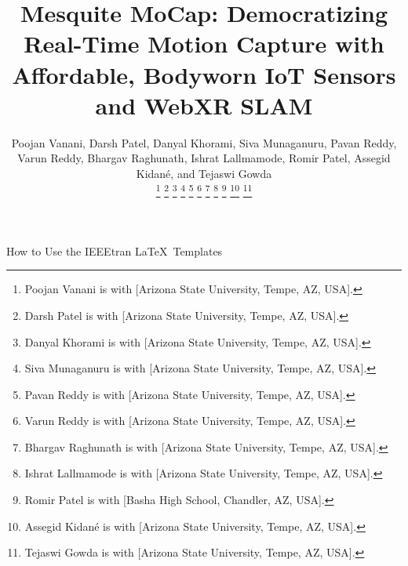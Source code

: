 \documentclass[lettersize,journal]{IEEEtran}
\begin{document}
\title{Mesquite MoCap: Democratizing Real-Time Motion Capture with Affordable, Bodyworn IoT Sensors and WebXR SLAM}

\author{Poojan Vanani, 
        Darsh Patel, 
        Danyal Khorami, 
        Siva Munaganuru, 
        Pavan Reddy, 
        Varun Reddy, 
        Bhargav Raghunath, 
        Ishrat Lallmamode,
        Romir Patel,
        Assegid Kidan\'e, 
        and Tejaswi Gowda%


\thanks{Poojan Vanani is with [Arizona State University, Tempe, AZ, USA].}
\thanks{Darsh Patel is with [Arizona State University, Tempe, AZ, USA].}
\thanks{Danyal Khorami is with [Arizona State University, Tempe, AZ, USA].}
\thanks{Siva Munaganuru is with [Arizona State University, Tempe, AZ, USA].}
\thanks{Pavan Reddy is with [Arizona State University, Tempe, AZ, USA].}
\thanks{Varun Reddy is with [Arizona State University, Tempe, AZ, USA].}
\thanks{Bhargav Raghunath is with [Arizona State University, Tempe, AZ, USA].}
\thanks{Ishrat Lallmamode is with [Arizona State University, Tempe, AZ, USA].}
\thanks{Romir Patel is with [Basha High School, Chandler, AZ, USA].}
\thanks{Assegid Kidan\'e is with [Arizona State University, Tempe, AZ, USA].}
\thanks{Tejaswi Gowda is with [Arizona State University, Tempe, AZ, USA].}%
}

%
{How to Use the IEEEtran \LaTeX \ Templates}

\maketitle
\end{document}
